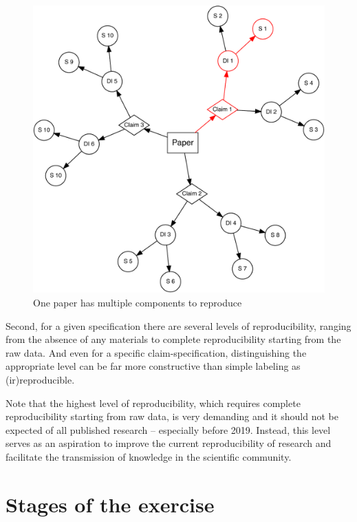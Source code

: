 \documentclass[]{book}
\begin{document}
\begin{figure}
\centering
\includegraphics{01-intro_files/figure-latex/diagram-1.pdf}
\caption{\label{fig:diagram}One paper has multiple components to reproduce}
\end{figure}

Second, for a given specification there are several levels of reproducibility, ranging from the absence of any materials to complete reproducibility starting from the raw data. And even for a specific claim-specification, distinguishing the appropriate level can be far more constructive than simple labeling as (ir)reproducible.

Note that the highest level of reproducibility, which requires complete reproducibility starting from raw data, is very demanding and it should not be expected of all published research -- especially before 2019. Instead, this level serves as an aspiration to improve the current reproducibility of research and facilitate the transmission of knowledge in the scientific community.

\hypertarget{stages-of-the-exercise}{%
\section*{Stages of the exercise}\label{stages-of-the-exercise}}
\end{document}
